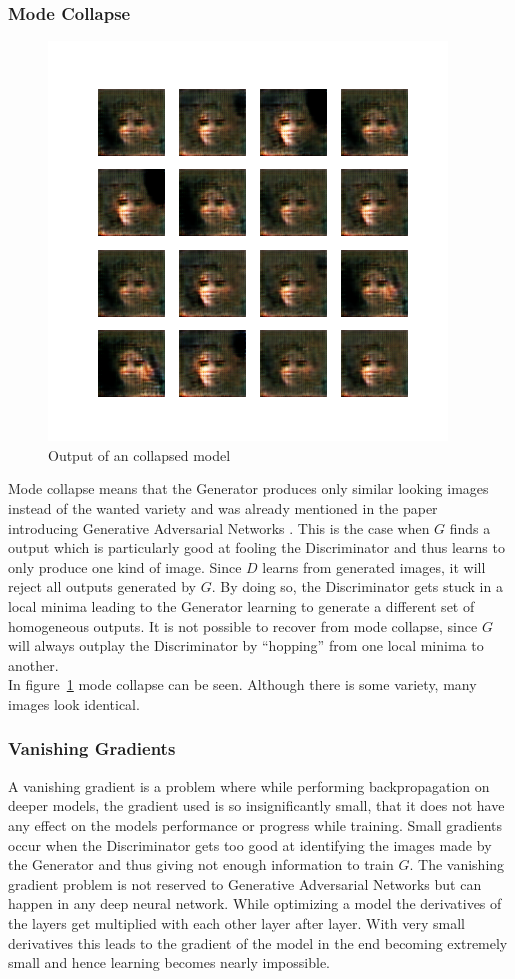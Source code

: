 \documentclass{article}
\begin{document}
\subsubsection{Mode Collapse}
\label{ref:mode_collapse}
\begin{figure}[!ht]
    \centering
    \includegraphics[width=.5\linewidth, trim={1.1cm, 1.1cm, 1.1cm, 1.1cm},clip]{images/image_at_epoch_0071.png}
    \caption{Output of an collapsed model}
    \label{fig:model_collapse}
\end{figure}
Mode collapse means that the Generator produces only similar looking images instead of the wanted variety and was already mentioned in the paper introducing Generative Adversarial Networks \autocite{goodfellow_generative_2014}. This is the case when $G$ finds a output which is particularly good at fooling the Discriminator and thus learns to only produce one kind of image. Since $D$ learns from generated images, it will reject all outputs generated by $G$. By doing so, the Discriminator gets stuck in a local minima leading to the Generator learning to generate a different set of homogeneous outputs. It is not possible to recover from mode collapse, since $G$ will always outplay the Discriminator by ``hopping'' from one local minima to another. \\
In figure~\ref{fig:model_collapse} mode collapse can be seen. Although there is some variety, many images look identical.

\subsubsection{Vanishing Gradients}
A vanishing gradient is a problem where while performing \gls{backpropagation} on deeper models, the gradient used is so insignificantly small, that it does not have any effect on the models performance or progress while training. Small gradients occur when the Discriminator gets too good at identifying the images made by the Generator and thus giving not enough information to train $G$. The vanishing gradient problem is not reserved to Generative Adversarial Networks but can happen in any deep neural network. While optimizing a model the derivatives of the layers get multiplied with each other layer after layer. With very small derivatives this leads to the gradient of the model in the end becoming extremely small and hence learning becomes nearly impossible. 
\end{document}
